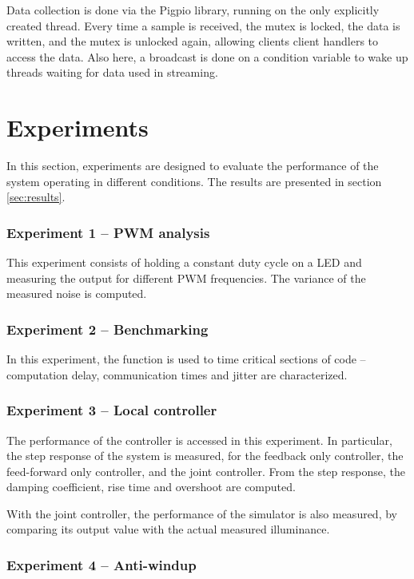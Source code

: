 \documentclass[english,fira]{ist-report}
\begin{document}
Data collection is done via the Pigpio library, running on the only explicitly created thread. Every time a sample is received, the mutex is locked, the data is written, and the mutex is unlocked again, allowing clients client handlers to access the data. Also here, a broadcast is done on a condition variable to wake up threads waiting for data used in streaming.

\section{Experiments}

In this section, experiments are designed to evaluate the performance of the system operating in different conditions.
The results are presented in section \ref{sec:results}.

\subsubsection*{Experiment 1 -- PWM analysis}

This experiment consists of holding a constant duty cycle on a LED and measuring the output for different PWM frequencies. The variance of the measured noise is computed.

\subsubsection*{Experiment 2 -- Benchmarking}

In this experiment, the  function is used to time critical sections of code -- computation delay, communication times and jitter are characterized.

\subsubsection*{Experiment 3 -- Local controller}

The performance of the controller is accessed in this experiment.
In particular, the step response of the system is measured, for the feedback only controller, the feed-forward only controller, and the joint controller. 
From the step response, the damping coefficient, rise time and overshoot are computed.

With the joint controller, the performance of the simulator is also measured, by comparing its output value with the actual measured illuminance.

\subsubsection*{Experiment 4 -- Anti-windup}
\end{document}
